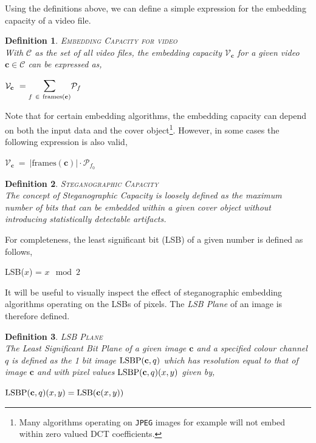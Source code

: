 \documentclass[paper=a4, fontsize=11pt,twoside]{scrartcl}
\numberwithin{table}{section}
\numberwithin{figure}{section}
\numberwithin{algorithm}{section}
\newtheorem{ddef}{Definition}[section]
\begin{document}
Using the definitions above, we can define a simple expression for the embedding capacity of a video file. 
\begin{ddef}
\textsc{Embedding Capacity for video}\\[5pt]
With $\mathcal{C}$ as the set of all video files, the embedding capacity $\mathcal{V} _{\textbf{c}}$ for a given video $\textbf{c} \in \mathcal{C}$ can be expressed as,
\begin{center}
	$\mathcal{V} _{\textbf{c}} ~= \mathlarger{\mathlarger{\sum}}\limits_{f ~\in ~\textnormal{frames}(\textbf{c})} \mathcal{P} _{f}$
\end{center}
\end{ddef}
\noindent
Note that for certain embedding algorithms, the embedding capacity can depend on both the input data and the cover object\footnote{Many algorithms operating on \texttt{JPEG} images for example will not embed within zero valued DCT coefficients.}. However, in some cases the following expression is also valid,
\begin{center}
	$\mathcal{V} _{\textbf{c}} ~=~ |\text{frames}(\textbf{c})| \cdot \mathcal{P} _{f _{0}}$
\end{center}
\pagebreak
\begin{ddef}
\textsc{Steganographic Capacity}\\[5pt]
The concept of Steganographic Capacity is loosely defined as the maximum number of bits that can be embedded within a given cover object without introducing statistically detectable artifacts. %
\end{ddef}
\noindent
For completeness, the least significant bit (LSB) of a given number is defined as follows,
\begin{center}
	LSB($x$) = $x \mod 2$
\end{center}

\noindent
It will be useful to visually inspect the effect of steganographic embedding algorithms operating on the LSBs of pixels. The \textit{LSB Plane} of an image is therefore defined.

\begin{ddef}
\textsc{LSB Plane}\\[5pt]
The Least Significant Bit Plane of a given image $\mathcal{\textbf{c}}$ and a specified colour channel $q$ is defined as the 1 bit image $\textnormal{LSBP}(\mathcal{\textbf{c}},q)$ which has resolution equal to that of image $\mathcal{\textbf{c}}$ and with pixel values  $\textnormal{LSBP}(\mathcal{\textbf{c}},q)(x,y)$ given by,
\begin{center}
	$\textnormal{LSBP}(\mathcal{\textbf{c}},q)(x,y) = \textnormal{LSB}(\mathcal{\textbf{c}}(x,y))$
\end{center} 
\end{ddef}
\end{document}
